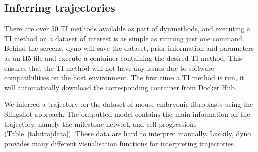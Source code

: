 \subsection{Inferring trajectories}
There are over 50 TI methods available as part of {dynmethods}, and executing a TI method on a dataset of interest is as simple as running just one command.
Behind the screens, {dyno} will save the dataset, prior
information and parameters as an H5 file and execute a container containing
the desired TI method. This
ensures that the TI method will not have any issues due to software
compatibilities on the host environment. The first time a TI method is
run, it will automatically download the corresponding container from
Docker Hub.

We inferred a trajectory on the dataset of mouse embryonic fibroblasts using the Slingshot \cite{street_slingshotcelllineage_2018} approach. The outputted model contains the main information on the trajectory, namely the milestone network and cell progressions (Table~\ref{tab:trajdata}). These data are hard to interpret manually. Luckily, {dyno} provides many different visualisation functions for interpreting trajectories.

